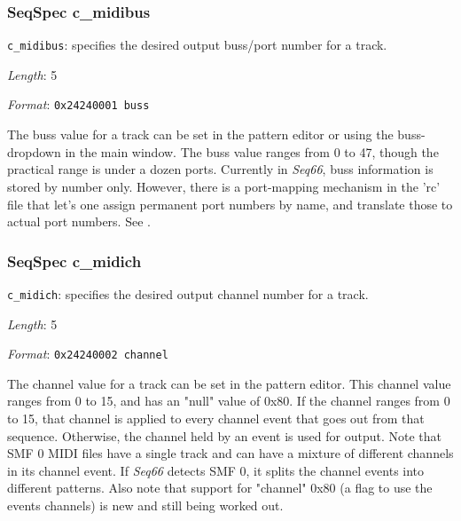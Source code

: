 \subsubsection{SeqSpec c\_midibus}
\label{subsubsec:midi_format_track_seqspec_midibus}

   \begin{description}
      \item \texttt{c\_midibus}:
         specifies the desired output buss/port number for a track.
      \item \textsl{Length}: 5
      \item \textsl{Format}: \texttt{0x24240001 buss}
   \end{description}

   The buss value for a track can be set in the pattern editor or using the
   buss-dropdown in the main window.
   The buss value ranges from 0 to 47, though the practical range is under a
   dozen ports.  Currently in \textsl{Seq66}, buss information is stored by
   number only.  However, there is a port-mapping mechanism in the 'rc' file
   that let's one assign permanent port numbers by name, and translate those to
   actual port numbers.
   See .

\subsubsection{SeqSpec c\_midich}
\label{subsubsec:midi_format_track_seqspec_midich}

   \begin{description}
      \item \texttt{c\_midich}:
         specifies the desired output channel number for a track.
      \item \textsl{Length}: 5
      \item \textsl{Format}: \texttt{0x24240002 channel}
   \end{description}

   The channel value for a track can be set in the pattern editor.
   This channel value ranges from 0 to 15, and has an "null" value of 0x80.  If
   the channel ranges from 0 to 15, that channel is applied to every channel
   event that goes out from that sequence.  Otherwise, the channel held by an
   event is used for output.  Note that SMF 0 MIDI files have a single track
   and can have a mixture of different channels in its channel event.
   If \textsl{Seq66} detects SMF 0, it splits the channel events into different
   patterns.
   Also note that support for "channel" 0x80 (a flag to use the events
   channels) is new and still being worked out.


